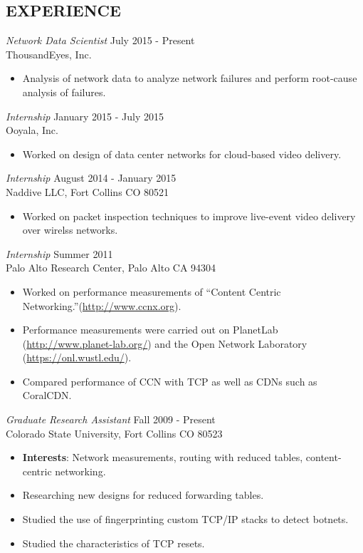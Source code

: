 \documentclass[line,margin]{res}
\begin{document}
\begin{resume}
\section{EXPERIENCE}
	{\sl Network Data Scientist} \hfill July 2015 - Present\\
	ThousandEyes, Inc.
	\begin{itemize}
		\item Analysis of network data to analyze network failures and perform
			root-cause analysis of failures.
		\end{itemize}
	{\sl Internship} \hfill January 2015 - July 2015\\
	Ooyala, Inc.
	\begin{itemize}
		\item Worked on design of data center networks for cloud-based video
			delivery.
	\end{itemize}
	{\sl Internship} \hfill August 2014 - January 2015\\
	Naddive LLC, Fort Collins CO 80521
	\begin{itemize}
		\item Worked on packet inspection techniques to improve live-event video
			delivery over wirelss networks.
	\end{itemize}
    {\sl Internship} \hfill Summer 2011\\
      Palo Alto Research Center, Palo Alto CA 94304 \\
      \begin{itemize}
      \item Worked on performance measurements of ``Content Centric
		  Networking.''(\url{http://www.ccnx.org}).
      \item Performance measurements were carried out on PlanetLab (\url{http://www.planet-lab.org/}) and the Open Network
      Laboratory (\url{https://onl.wustl.edu/}).
      \item Compared performance of CCN with TCP as well as CDNs such as CoralCDN.
      \end{itemize}

    {\sl Graduate Research Assistant} \hfill Fall 2009 - Present\\
        Colorado State University, Fort Collins CO 80523
        \begin{itemize}  \itemsep -2pt
				\item {\bf Interests}: Network measurements, routing with reduced tables, content-centric networking.
            \item Researching new designs for reduced forwarding tables.
            \item Studied the use of fingerprinting custom TCP/IP stacks to detect botnets.
            \item Studied the characteristics of TCP resets.
        \end{itemize}


\end{resume}
\end{document}
